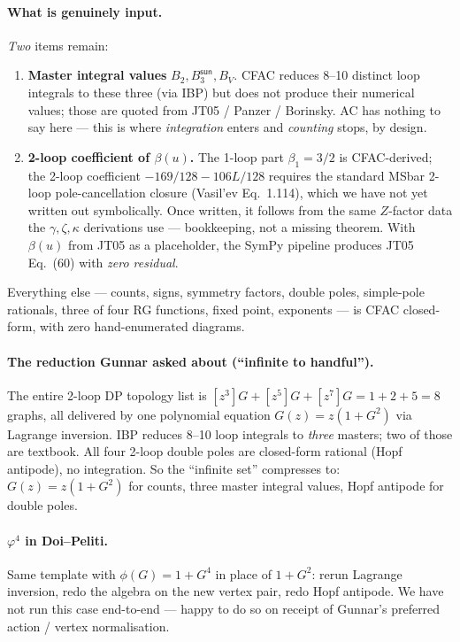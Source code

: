 \documentclass[11pt,a4paper]{article}
\begin{document}
\paragraph{What is genuinely input.} \emph{Two} items remain:
\begin{enumerate}[leftmargin=2em,itemsep=1pt,topsep=2pt]
  \item \textbf{Master integral values} $B_2, B_3^{\textsf{sun}}, B_V$. CFAC reduces 8--10 distinct loop integrals to these three (via IBP) but does not produce their numerical values; those are quoted from JT05 / Panzer / Borinsky. AC has nothing to say here --- this is where \emph{integration} enters and \emph{counting} stops, by design.
  \item \textbf{2-loop coefficient of $\beta(u)$.} The 1-loop part $\beta_1 = 3/2$ is CFAC-derived; the 2-loop coefficient $-169/128 - 106L/128$ requires the standard MSbar 2-loop pole-cancellation closure (Vasil'ev Eq.~1.114), which we have not yet written out symbolically. Once written, it follows from the same $Z$-factor data the $\gamma,\zeta,\kappa$ derivations use --- bookkeeping, not a missing theorem. With $\beta(u)$ from JT05 as a placeholder, the SymPy pipeline produces JT05 Eq.~(60) with \emph{zero residual}.
\end{enumerate}
Everything else --- counts, signs, symmetry factors, double poles, simple-pole rationals, three of four RG functions, fixed point, exponents --- is CFAC closed-form, with zero hand-enumerated diagrams.

\paragraph{The reduction Gunnar asked about (``infinite to handful'').}
The entire 2-loop DP topology list is $[z^3]G + [z^5]G + [z^7]G = 1+2+5 = 8$ graphs, all delivered by one polynomial equation $G(z)=z(1+G^2)$ via Lagrange inversion. IBP reduces 8--10 loop integrals to \emph{three} masters; two of those are textbook. All four 2-loop double poles are closed-form rational (Hopf antipode), no integration. So the ``infinite set'' compresses to: $G(z)=z(1+G^2)$ for counts, three master integral values, Hopf antipode for double poles.

\paragraph{$\varphi^4$ in Doi--Peliti.} Same template with $\phi(G)=1+G^4$ in place of $1+G^2$: rerun Lagrange inversion, redo the algebra on the new vertex pair, redo Hopf antipode. We have not run this case end-to-end --- happy to do so on receipt of Gunnar's preferred action / vertex normalisation.
\end{document}
